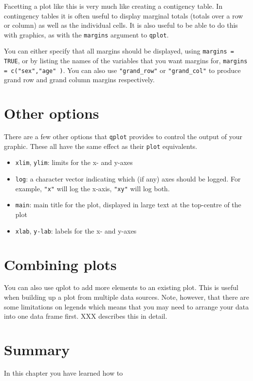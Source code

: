 Facetting a plot like this is very much like creating a contigency table.  In contingency tables it is often useful to display marginal totals (totals over a row or column) as well as the individual cells.  It is also useful to be able to do this with graphics, as with the {\tt margins} argument to {\tt qplot}.  

You can either specify that all margins should be displayed, using {\tt margins = TRUE}, or by listing the names of the variables that you want margins for, {\tt margins = c("sex","age" )}.  You can also use {\tt "grand\_row"} or {\tt "grand\_col"} to produce grand row and grand column margins respectively.

\section{Other options}\label{sec:other_options}

There are a few other options that {\tt qplot} provides to control the output of your graphic.  These all have the same effect as their {\tt plot} equivalents.

\begin{itemize}
	\item {\tt xlim}, {\tt ylim}: limits for the x- and y-axes 
	\item {\tt log}: a character vector indicating which (if any) axes should be logged.  For example, {\tt "x"} will log the x-axis, {\tt "xy"} will log both.
	\item {\tt main}: main title for the plot, displayed in large text at the top-centre of the plot
	\item {\tt xlab}, {\tt y-lab}: labels for the x- and y-axes
\end{itemize}

\section{Combining plots}\label{sec:combining_plots}

You can also use qplot to add more elements to an existing plot.  This is useful when building up a plot from multiple data sources.  Note, however, that there are some limitations on legends which means that you may need to arrange your data into one data frame first.  XXX describes this in detail.

\section{Summary}

In this chapter you have learned how to 


